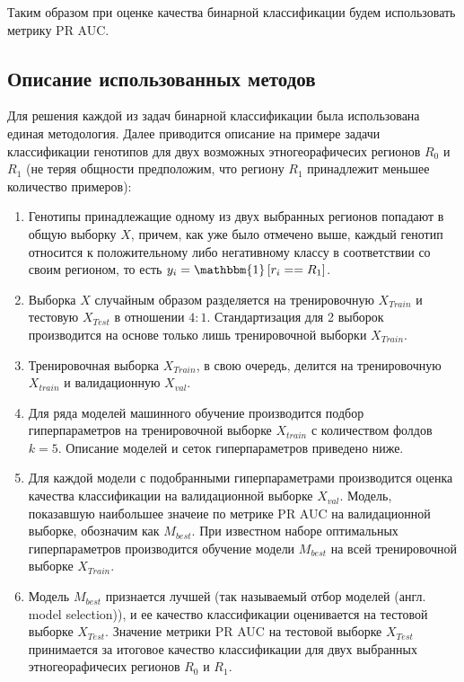 Таким образом при оценке качества бинарной классификации будем использовать метрику PR AUC.

\subsection{Описание использованных методов}

Для решения каждой из задач бинарной классификации была использована единая методология.
Далее приводится описание на примере задачи классификации генотипов для двух возможных
этногеорафичесих регионов $R_{0}$ и $R_{1}$ (не теряя общности предположим, что региону $R_{1}$
принадлежит меньшее количество примеров):

\begin{enumerate}
\item Генотипы принадлежащие одному из двух выбранных регионов попадают в общую выборку $X$,
причем, как уже было отмечено выше, каждый генотип относится к положительному либо
негативному классу в соответствии со своим регионом, то есть $y_{i} = \mathbbm{1} \left[ r_{i} == R_{1} \right]$.

\item Выборка $X$ случайным образом разделяется на тренировочную $X_{Train}$ и тестовую $X_{Test}$
в отношении $4:1$. Стандартизация для 2 выборок производится на основе только лишь
тренировочной выборки $X_{Train}$.

\item Тренировочная выборка $X_{Train}$, в свою очередь, делится на тренировочную $X_{train}$ и
валидационную $X_{val}$.

\item Для ряда моделей машинного обучение производится подбор гиперпараметров на тренировочной выборке
$X_{train}$ с количеством фолдов $k=5$. Описание моделей и сеток гиперпараметров приведено ниже.

\item Для каждой модели с подобранными гиперпараметрами производится оценка качества классификации
на валидационной выборке $X_{val}$. Модель, показавшую наибольшее значеие по метрике PR AUC на валидационной
выборке, обозначим как $M_{best}$. При известном наборе оптимальных гиперпараметров производится обучение
модели $M_{best}$ на всей тренировочной выборке $X_{Train}$.

\item Модель $M_{best}$ признается лучшей (так называемый отбор моделей
(англ. model selection)), и ее качество классификации оценивается на тестовой выборке $X_{Test}$.
Значение метрики PR AUC на тестовой выборке $X_{Test}$ принимается за итоговое качество классификации
для двух выбранных этногеорафичесих регионов $R_{0}$ и $R_{1}$.

\end{enumerate}

